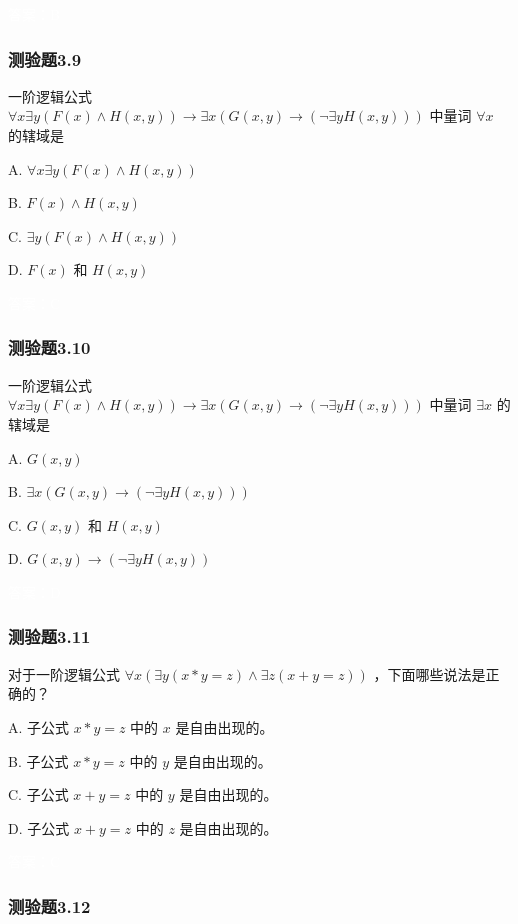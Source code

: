 \documentclass[UTF8, heading=true]{ctexart}
\begin{document}
\textcolor{white}{答案：B}

\subsubsection{测验题3.9}

一阶逻辑公式 $\forall x \exists y(F(x) \wedge H(x, y)) \rightarrow \exists x(G(x, y) \rightarrow(\neg \exists y H(x, y)))$ 中量词 $\forall x$ 的辖域是 $\qquad$

A. $\forall x \exists y(F(x) \wedge H(x, y))$

B. $F(x) \wedge H(x, y)$

C. $\exists y(F(x) \wedge H(x, y))$

D. $F(x)$ 和 $H(x, y)$

\textcolor{white}{答案：C}

\subsubsection{测验题3.10}

一阶逻辑公式 $\forall x \exists y(F(x) \wedge H(x, y)) \rightarrow \exists x(G(x, y) \rightarrow(\neg \exists y H(x, y)))$ 
中量词 $\exists x$ 的辖域是 $\qquad$

A. $G(x, y)$

B. $\exists x(G(x, y) \rightarrow(\neg \exists y H(x, y)))$

C. $G(x, y)$ 和 $H(x, y)$

D. $G(x, y) \rightarrow(\neg \exists y H(x, y))$

\textcolor{white}{答案：D}

\subsubsection{测验题3.11}

对于一阶逻辑公式 $\forall x(\exists y(x * y=z) \wedge \exists z(x+y=z))$ ，下面哪些说法是正确的？

A. 子公式 $x * y=z$ 中的 $x$ 是自由出现的。

B. 子公式 $x * y=z$ 中的 $y$ 是自由出现的。

C. 子公式 $x+y=z$ 中的 $y$ 是自由出现的。

D.  子公式 $x+y=z$ 中的 $z$ 是自由出现的。

\textcolor{white}{答案：C}

\subsubsection{测验题3.12}
\end{document}
